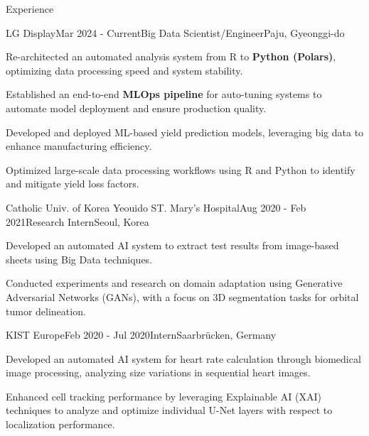 \documentclass[
	11pt, %
]{resume} %
\begin{document}

\begin{rSection}{Experience}
	\begin{rSubsection}{LG Display}{Mar 2024 - Current}{Big Data Scientist/Engineer}{Paju, Gyeonggi-do}
		\item Re-architected an automated analysis system from R to \textbf{Python (Polars)}, optimizing data processing speed and system stability.
		\item Established an end-to-end \textbf{MLOps pipeline} for auto-tuning systems to automate model deployment and ensure production quality.
		\item Developed and deployed ML-based yield prediction models, leveraging big data to enhance manufacturing efficiency.
		\item Optimized large-scale data processing workflows using R and Python to identify and mitigate yield loss factors.
	\end{rSubsection}
	
	\begin{rSubsection}{Catholic Univ. of Korea Yeouido ST. Mary's Hospital}{Aug 2020 - Feb 2021}{Research Intern}{Seoul, Korea} 
		\item Developed an automated AI system to extract test results from image-based sheets using Big Data techniques.
		\item Conducted experiments and research on domain adaptation using Generative Adversarial Networks (GANs), with a focus on 3D segmentation tasks for orbital tumor delineation.
	\end{rSubsection}
	
	\begin{rSubsection}{KIST Europe}{Feb 2020 - Jul 2020}{Intern}{Saarbrücken, Germany}
		\item Developed an automated AI system for heart rate calculation through biomedical image processing, analyzing size variations in sequential heart images.
		\item Enhanced cell tracking performance by leveraging Explainable AI (XAI) techniques to analyze and optimize individual U-Net layers with respect to localization performance.
	\end{rSubsection}

\end{rSection}
\end{document}
